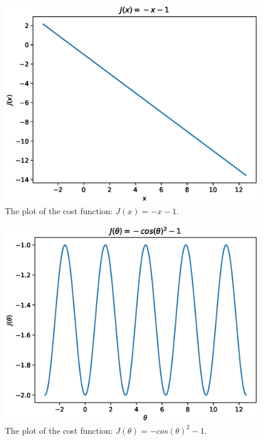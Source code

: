 \documentclass[a4paper,12pt]{article}
\begin{document}
\begin{figure}[H]
\begin{center}
\includegraphics[width=1.0\linewidth]{line.eps}

\end{center}
   \caption{The plot of the cost function: $J(x) = -x-1$.  }
\label{fig:line_cost_sphe}
\end{figure}



\begin{figure}[H]
\begin{center}
\includegraphics[width=1.0\linewidth]{line_sphe.eps}


\end{center}
   \caption{The plot of the cost function: $J(\theta) = -cos(\theta)^2-1$. }
\label{fig:e1}
\end{figure}
\end{document}
